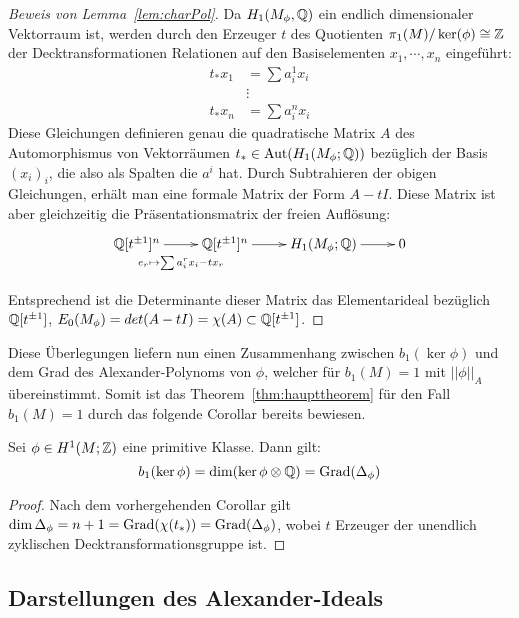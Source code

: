 \begin{proof}[Beweis von Lemma~\ref{lem:charPol}]
	Da $H_1(M_\phi,\mathbb{Q})$ ein endlich dimensionaler Vektorraum ist, werden durch den Erzeuger $t$ des Quotienten $\pi_1(M)/\ker(\phi) \cong \mathbb{Z}$ der Decktransformationen Relationen auf den Basiselementen $x_1,\cdots,x_n$ eingeführt:	
	\begin{align*}
		t_*x_1 &= \sum a_i^1 x_i \\
				&\vdots \\
		t_*x_n &= \sum a_i^n x_i
	\end{align*}
	Diese Gleichungen definieren genau die quadratische Matrix $A$ des Automorphismus von Vektorräumen $t_* \in \operatorname{Aut} (H_1(M_\phi;\mathbb{Q}))$ bezüglich der Basis $(x_i)_i$, die also als Spalten die $a^i$ hat. Durch Subtrahieren der obigen Gleichungen, erhält man eine formale Matrix der Form $A-tI$. Diese Matrix ist aber gleichzeitig die Präsentationsmatrix der freien Auflösung:
	\[
		\begin{xy}
			\xymatrix@L+5pt{\laurent \QQ t ^n \ar[r]_{e_r\mapsto \sum a_i^rx_i-tx_r} & \laurent \QQ t ^n \ar[r] & H_1(M_\phi;\QQ) \ar[r] &0\\}
		\end{xy}
	\]
	Entsprechend ist die Determinante dieser Matrix das Elementarideal bezüglich $\mathbb{Q}[t^{\pm 1}]$, $E_0(M_\phi)=det(A-tI)=\chi(A) \subset \mathbb{Q}[t^{\pm 1}] $. 
\end{proof}



Diese Überlegungen liefern nun einen Zusammenhang zwischen $b_1(\ker\phi)$ und dem Grad des Alexander-Polynoms von $\phi$, welcher für $b_1(M)=1$ mit $||\phi||_A$ übereinstimmt. Somit ist das Theorem~\ref{thm:haupttheorem} für den Fall $b_1(M)=1$ durch das folgende Corollar bereits bewiesen.
\begin{cor}
\label{cor:degreealex}
	Sei $\phi \in H^1(M;\mathbb{Z})$ eine primitive Klasse. Dann gilt:
	\[
		b_1(\ker\phi)=\dim(\ker\phi \otimes \mathbb{Q}) = \operatorname{Grad}(\Delta_\phi) 
	\]
\end{cor}
\begin{proof}
	Nach dem vorhergehenden Corollar gilt $\dim \Delta_\phi = n+1 = \operatorname{Grad}(\chi(t_*)) = \operatorname{Grad}(\Delta_\phi)$, wobei $t$ Erzeuger der unendlich zyklischen Decktransformationsgruppe ist. 
\end{proof}

\subsection{Darstellungen des Alexander-Ideals}

